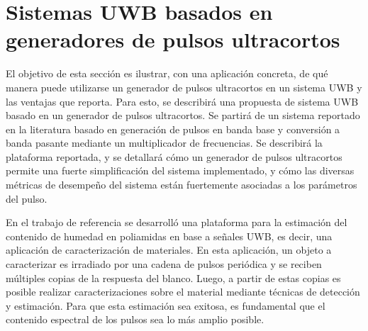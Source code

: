 \section{Sistemas UWB basados en generadores de pulsos ultracortos}

El objetivo de esta sección es ilustrar, con una aplicación concreta, de qué
manera puede utilizarse un generador de pulsos ultracortos en un sistema UWB y
las ventajas que reporta. Para esto, se describirá una propuesta de sistema UWB
basado en un generador de pulsos ultracortos. Se partirá de un sistema reportado
en la literatura \cite{Altieri2021} basado en generación de pulsos en banda base
y conversión a banda pasante mediante un multiplicador de frecuencias. Se
describirá la plataforma reportada, y se detallará cómo un generador de pulsos
ultracortos permite una fuerte simplificación del sistema implementado, y cómo
las diversas métricas de desempeño del sistema están fuertemente asociadas a los
parámetros del pulso.

En el trabajo de referencia \cite{Altieri2021} se desarrolló una plataforma para
la estimación del contenido de humedad en poliamidas en base a señales UWB, es
decir, una aplicación de caracterización de materiales. En esta aplicación, un
objeto a caracterizar es irradiado por una cadena de pulsos periódica y se
reciben múltiples copias de la respuesta del blanco. Luego, a partir de estas
copias es posible realizar caracterizaciones sobre el material mediante técnicas
de detección y estimación.  Para que esta estimación sea exitosa, es fundamental
que el contenido espectral de los pulsos sea lo más amplio posible.

